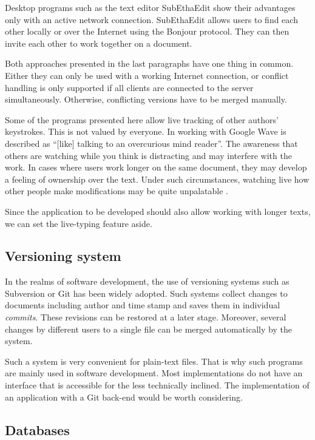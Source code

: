 Desktop programs such as the text editor SubEthaEdit \cite{subethaedit:website} show their advantages only with an active network connection. SubEthaEdit allows users to find each other locally or over the Internet using the Bonjour protocol. They can then invite each other to work together on a document.

Both approaches presented in the last paragraphs have one thing in common. Either they can only be used with a working Internet connection, or conflict handling is only supported if all clients are connected to the server simultaneously. Otherwise, conflicting versions have to be merged manually.

Some of the programs presented here allow live tracking of other authors' keystrokes. This is not valued by everyone. In \cite{google:wavetyping} working with Google Wave is described as \enquote{[like] talking to an overcurious mind reader}. The awareness that others are watching while you think is distracting and may interfere with the work. In cases where users work longer on the same document, they may develop a feeling of ownership over the text. Under such circumstances, watching live how other people make modifications may be quite unpalatable .

Since the application to be developed should also allow working with longer texts, we can set the live-typing feature aside.

\subsection{Versioning system}

In the realms of software development, the use of versioning systems such as Subversion \cite{subversion:website} or Git \cite{git:website} has been widely adopted. Such systems collect changes to documents including author and time stamp and saves them in individual \textit{commits}. These revisions can be restored at a later stage. Moreover, several changes by different users to a single file can be merged automatically by the system.

Such a system is very convenient for plain-text files. That is why such programs are mainly used in software development. Most implementations do not have an interface that is accessible for the less technically inclined. The implementation of an application with a Git back-end would be worth considering.

\subsection{Databases}

